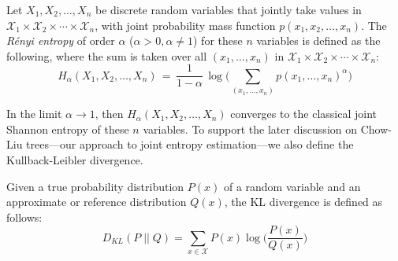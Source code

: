\begin{definition}
Let \(X_1, X_2, \dots, X_n\) be discrete random variables that jointly take values in
\(\mathcal{X}_1 \times \mathcal{X}_2 \times \cdots \times \mathcal{X}_n\),
with joint probability mass function
\(p(x_1, x_2, \dots, x_n)\).
The \emph{R\'{e}nyi entropy} of order \(\alpha\) (\(\alpha > 0, \alpha \neq 1\)) for these \(n\) variables is defined as the following, where the sum is taken over all \((x_1,\dots,x_n)\) in
\(\mathcal{X}_1 \times \mathcal{X}_2 \times \cdots \times \mathcal{X}_n\):
\begin{equation}
H_{\alpha}(X_1, X_2, \dots, X_n)
\,=\, \frac{1}{1 - \alpha}\,\log\Biggl(
  \sum_{(x_1,\dots,x_n)} p(x_1, \dots, x_n)^{\alpha}
\Biggr)
\label{eq:multivariate_renyi_entropy}
\end{equation}


\end{definition}

In the limit \(\alpha \to 1\), then \(H_{\alpha}(X_1, X_2, \dots, X_n)\) converges to the classical joint Shannon entropy of these \(n\) variables. To support the later discussion on Chow-Liu trees---our approach to joint entropy estimation---we also define the Kullback-Leibler divergence.

\begin{definition}\label{def:kl} Given a true probability distribution \( P(x) \) of a random variable and an approximate or reference distribution \( Q(x) \), the KL divergence is defined as follows:
\begin{equation}
    D_{KL}(P\;||\; Q) = \sum_{x \in \mathcal{X}}P(x)\log\Big(\frac{P(x)}{Q(x)}\Big)
\end{equation}
\end{definition}

